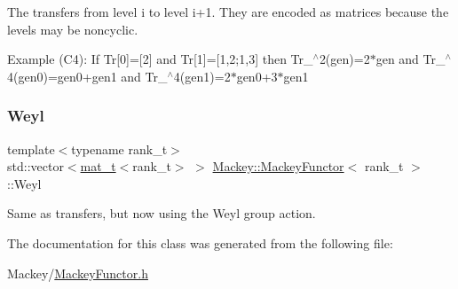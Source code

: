 The transfers from level i to level i+1. They are encoded as matrices because the levels may be noncyclic. 

Example (C4)\+: If Tr\mbox{[}0\mbox{]}=\mbox{[}2\mbox{]} and Tr\mbox{[}1\mbox{]}=\mbox{[}1,2;1,3\mbox{]} then Tr\+\_$^\wedge$2(gen)=2$\ast$gen and Tr\+\_$^\wedge$4(gen0)=gen0+gen1 and Tr\+\_$^\wedge$4(gen1)=2$\ast$gen0+3$\ast$gen1 \mbox{\label{classMackey_1_1MackeyFunctor_a22162c7320c3793b5cdaad62b063d057}} 
\subsubsection{\texorpdfstring{Weyl}{Weyl}}
{\footnotesize\ttfamily template$<$typename rank\+\_\+t$>$ \\
std\+::vector$<$\hyperlink{namespaceMackey_a035386035757dade630f685e508e5cf9}{mat\+\_\+t}$<$rank\+\_\+t$>$ $>$ \hyperlink{classMackey_1_1MackeyFunctor}{Mackey\+::\+Mackey\+Functor}$<$ rank\+\_\+t $>$\+::Weyl}



Same as transfers, but now using the Weyl group action. 



The documentation for this class was generated from the following file\+:\begin{DoxyCompactItemize}
\item 
Mackey/\hyperlink{MackeyFunctor_8h}{Mackey\+Functor.\+h}\end{DoxyCompactItemize}
